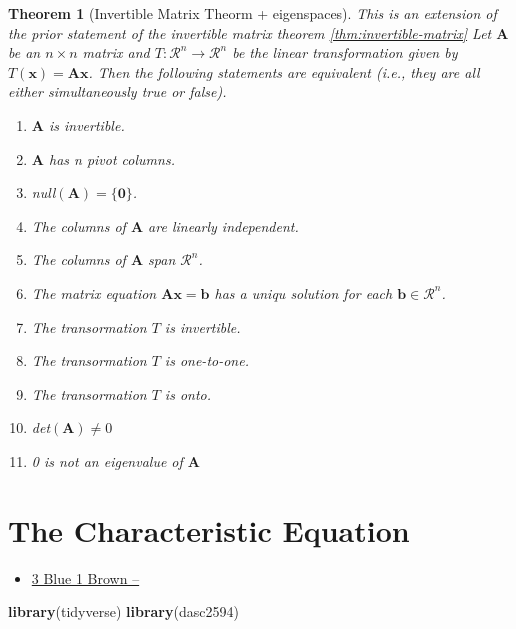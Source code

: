 \documentclass[
]{book}
\newenvironment{Shaded}{\begin{snugshade}}{\end{snugshade}}
\newcommand{\KeywordTok}[1]{\textcolor[rgb]{0.13,0.29,0.53}{\textbf{#1}}}
\newcommand{\NormalTok}[1]{#1}
\providecommand{\tightlist}{%
  \setlength{\itemsep}{0pt}\setlength{\parskip}{0pt}}
\newtheorem{theorem}{Theorem}[chapter]
\theoremstyle{definition}
\theoremstyle{definition}
\theoremstyle{definition}
\theoremstyle{remark}
\begin{document}
\begin{theorem}[Invertible Matrix Theorm + eigenspaces]
\protect\hypertarget{thm:unnamed-chunk-247}{}{\label{thm:unnamed-chunk-247} {} }This is an extension of the prior statement of the invertible matrix theorem \ref{thm:invertible-matrix}
Let \(\mathbf{A}\) be an \(n \times n\) matrix and \(T: \mathcal{R}^n \rightarrow \mathcal{R}^n\) be the linear transformation given by \(T(\mathbf{x}) = \mathbf{A}\mathbf{x}\). Then the following statements are equivalent (i.e., they are all either simultaneously true or false).

\begin{enumerate}
\def\labelenumi{\arabic{enumi})}
\item
  \(\mathbf{A}\) is invertible.
\item
  \(\mathbf{A}\) has n pivot columns.
\item
  null\((\mathbf{A}) = \{\mathbf{0}\}\).
\item
  The columns of \(\mathbf{A}\) are linearly independent.
\item
  The columns of \(\mathbf{A}\) span \(\mathcal{R}^n\).
\item
  The matrix equation \(\mathbf{A} \mathbf{x} = \mathbf{b}\) has a uniqu solution for each \(\mathbf{b} \in \mathcal{R}^n\).
\item
  The transormation \(T\) is invertible.
\item
  The transormation \(T\) is one-to-one.
\item
  The transormation \(T\) is onto.
\item
  det\((\mathbf{A}) \neq 0\)
\item
  0 is not an eigenvalue of \(\mathbf{A}\)
\end{enumerate}
\end{theorem}

\hypertarget{the-characteristic-equation}{%
\chapter{The Characteristic Equation}\label{the-characteristic-equation}}

\begin{itemize}
\tightlist
\item
  \href{https://www.3blue1brown.com/lessons/quick-eigen}{3 Blue 1 Brown --}
\end{itemize}

\begin{Shaded}
\begin{Highlighting}[]
\KeywordTok{library}\NormalTok{(tidyverse)}
\KeywordTok{library}\NormalTok{(dasc2594)}
\end{Highlighting}
\end{Shaded}
\end{document}
